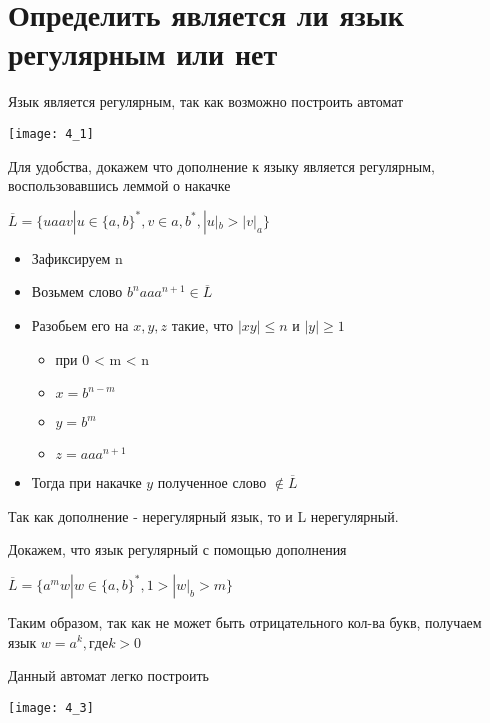 \documentclass[a4paper, 12pt]{article}
\begin{document}
\section{Определить является ли язык регулярным или нет}
\begin{description}
  \item [$L = \{(aab)^{n}b(aba)^{m}| n \geq 0, m \geq 0\}$]
  \item Язык является регулярным, так как возможно построить автомат
  \item \texttt{[image: 4\_1]}
  
  \item [$L = \{ uaav |u \in \{a, b\}^{*}, v \in a,b^{*}, |u|_b \geq |v|_a \}$]
  \item Для удобства, докажем что дополнение к языку является регулярным, воспользовавшись леммой о накачке
  \item $\overline{L} = \{ uaav |u \in \{a, b\}^{*}, v \in a,b^{*}, |u|_b > |v|_a \}$
    \begin{itemize}
      \item Зафиксируем n
      \item Возьмем слово $b^n aa a^{n+1} \in \overline{L}$
      \item Разобьем его на $x,y,z$ такие, что $|xy| \leq n$ и $|y| \geq 1$
      \begin{itemize}
        \item при 0 < m < n
        \item $x=b^{n-m}$
        \item $y=b^m$
        \item $z=aa a^{n+1}$
      \end{itemize}
      \item Тогда при накачке $y$ полученное слово $\notin \overline{L}$ 
    \end{itemize}
  \item Так как дополнение - нерегулярный язык, то и L нерегулярный.
  
  \item [$L = \{a^mw | w \in \{a, b\}^*, 1 \leq |w|_b \leq m\}$]
  \item Докажем, что язык регулярный с помощью дополнения
  \item $\overline{L} = \{a^mw | w \in \{a, b\}^*,1>|w|_b>m\}$
  \item Таким образом, так как не может быть отрицательного кол-ва букв, получаем язык $w=a^k, где k>0$
  \item Данный автомат легко построить
  \item \texttt{[image: 4\_3]}
  

\end{description}
\end{document}
